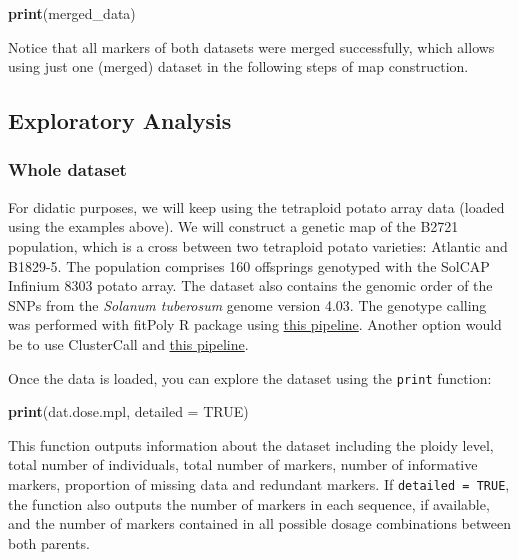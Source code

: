 \documentclass[
]{article}
\newenvironment{Shaded}{}{}
\newcommand{\DataTypeTok}[1]{\textcolor[rgb]{0.56,0.13,0.00}{#1}}
\newcommand{\KeywordTok}[1]{\textcolor[rgb]{0.00,0.44,0.13}{\textbf{#1}}}
\newcommand{\NormalTok}[1]{#1}
\newcommand{\OtherTok}[1]{\textcolor[rgb]{0.00,0.44,0.13}{#1}}
\begin{document}
\begin{Shaded}
\begin{Highlighting}[]
\KeywordTok{print}\NormalTok{(merged_data)}
\end{Highlighting}
\end{Shaded}

Notice that all markers of both datasets were merged successfully, which
allows using just one (merged) dataset in the following steps of map
construction.

\hypertarget{exploratory-analysis}{%
\subsection{Exploratory Analysis}\label{exploratory-analysis}}

\hypertarget{whole-dataset}{%
\subsubsection{Whole dataset}\label{whole-dataset}}

For didatic purposes, we will keep using the tetraploid potato array
data (loaded using the examples above). We will construct a genetic map
of the B2721 population, which is a cross between two tetraploid potato
varieties: Atlantic and B1829-5. The population comprises 160 offsprings
genotyped with the SolCAP Infinium 8303 potato array. The dataset also
contains the genomic order of the SNPs from the \emph{Solanum tuberosum}
genome version 4.03. The genotype calling was performed with fitPoly R
package using
\href{https://github.com/mmollina/Autopolyploid_Linkage/blob/master/src/solcap_map_construction/snp_calling/genotype_calling_public_data_fittetra.R}{this
pipeline}. Another option would be to use ClusterCall and
\href{https://mmollina.github.io/tutorials/solcap/solcap_example.html}{this
pipeline}.

Once the data is loaded, you can explore the dataset using the
\texttt{print} function:

\begin{Shaded}
\begin{Highlighting}[]
\KeywordTok{print}\NormalTok{(dat.dose.mpl, }\DataTypeTok{detailed =} \OtherTok{TRUE}\NormalTok{)}
\end{Highlighting}
\end{Shaded}

This function outputs information about the dataset including the ploidy
level, total number of individuals, total number of markers, number of
informative markers, proportion of missing data and redundant markers.
If \texttt{detailed\ =\ TRUE}, the function also outputs the number of
markers in each sequence, if available, and the number of markers
contained in all possible dosage combinations between both parents.
\end{document}
